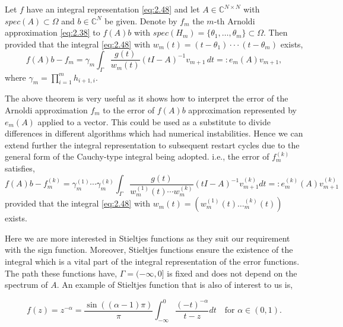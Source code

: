 \begin{theorem}
\label{the:2.19}
    \cite{52} Let $f$ have an integral representation \eqref{eq:2.48} and let $A \in \mathbb{C}^{N \times N}$ with $spec(A) \subset \Omega$ and $b \in \mathbb{C}^{N}$ be given. Denote by $f_{m}$ the $m$-th Arnoldi approximation \eqref{eq:2.38} to $f(A)b$ with $spec(H_{m}) = \{\theta_{1},\dots,\theta_{m}\} \subset \Omega$. Then provided that the integral \eqref{eq:2.48} with $ w_m (t) = (t - \theta_1 ) ··· (t - \theta_m )$ exists,
    \begin{equation}
        f(A)b - f_{m} = \gamma_{m} \int_{\Gamma} \frac{g(t)}{w_{m}(t)} (tI - A)^{-1} v_{m+1} \, dt =: e_{m}(A) v_{m+1},
        \label{eq:2.50}
    \end{equation}
    where $\gamma_{m}=\prod_{i=1}^{m}h_{i+1,i}$.    
\end{theorem}

The above theorem is very useful as it shows how to interpret the error of the Arnoldi approximation $f_{m}$ to the error of $f(A)b$ approximation represented by $e_{m}(A)$ applied to a vector. This could be used as a substitute to divide differences in different algorithms which had numerical instabilities. Hence we can extend further the integral representation to subsequent restart cycles due to the general form of the Cauchy-type integral being adopted. i.e., the error of $f_{m}^{(k)}$ satisfies,
\begin{equation}
    f(A)b - f_{m}^{(k)} = \gamma_{m}^{(1)} \cdots \gamma_{m}^{(k)} \int_{\Gamma} \frac{g(t)}{w_{m}^{(1)}(t) \cdots w_{m}^{(k)}} (tI-A)^{-1}v_{m+1}^{(k)} dt =: e_{m}^{(k)}(A)v_{m+1}^{(k)}
    \label{eq:2.51}
\end{equation}
provided that the integral \eqref{eq:2.48} with $w_{m}(t) = (w_{m}^{(1)}(t)\dots_{m}^{(k)}(t))$ exists.

Here we are more interested in Stieltjes functions as they suit our requirement with the sign function. Moreover, Stieltjes functions ensure the existence of the integral which is a vital part of the integral representation of the error functions. The path these functions have, $\Gamma=(-\infty, 0]$ is fixed and does not depend on the spectrum of $A$. An example of Stieltjes function that is also of interest to us is,

\begin{equation}
    f(z) = z^{-\alpha} = \frac{\sin((\alpha-1)\pi)}{\pi} \int_{-\infty}^{0} \frac{(-t)^{-\alpha}}{t-z} dt \quad \text{for } \alpha \in (0,1).
    \label{eq:2.52}
\end{equation}

